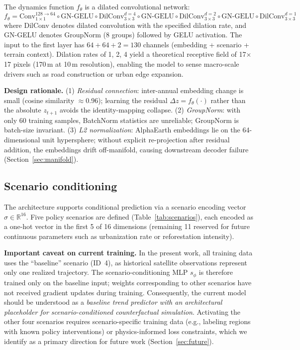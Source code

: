 \documentclass{article}
\begin{document}
The dynamics function $f_\theta$ is a dilated convolutional network:
\begin{equation}
f_\theta = \text{Conv}_{1\times1}^{128 \to 64} \circ \text{GN-GELU} \circ \text{DilConv}_{3\times3}^{d=4} \circ \text{GN-GELU} \circ \text{DilConv}_{3\times3}^{d=2} \circ \text{GN-GELU} \circ \text{DilConv}_{3\times3}^{d=1}
\end{equation}
where DilConv denotes dilated convolution with the specified dilation rate, and GN-GELU denotes GroupNorm (8 groups) followed by GELU activation. The input to the first layer has $64 + 64 + 2 = 130$ channels (embedding + scenario + terrain context). Dilation rates of 1, 2, 4 yield a theoretical receptive field of 17$\times$17 pixels (170\,m at 10\,m resolution), enabling the model to sense macro-scale drivers such as road construction or urban edge expansion.

\textbf{Design rationale.} (1) \textit{Residual connection}: inter-annual embedding change is small (cosine similarity $\approx$0.96); learning the residual $\Delta z = f_\theta(\cdot)$ rather than the absolute $z_{t+1}$ avoids the identity-mapping collapse. (2) \textit{GroupNorm}: with only 60 training samples, BatchNorm statistics are unreliable; GroupNorm is batch-size invariant. (3) \textit{L2 normalization}: AlphaEarth embeddings lie on the 64-dimensional unit hypersphere; without explicit re-projection after residual addition, the embeddings drift off-manifold, causing downstream decoder failure (Section~\ref{sec:manifold}).

\subsection{Scenario conditioning}

The architecture supports conditional prediction via a scenario encoding vector $\sigma \in \mathbb{R}^{16}$. Five policy scenarios are defined (Table~\ref{tab:scenarios}), each encoded as a one-hot vector in the first 5 of 16 dimensions (remaining 11 reserved for future continuous parameters such as urbanization rate or reforestation intensity).

\textbf{Important caveat on current training.} In the present work, all training data uses the ``baseline'' scenario (ID~4), as historical satellite observations represent only one realized trajectory. The scenario-conditioning MLP $s_\phi$ is therefore trained only on the baseline input; weights corresponding to other scenarios have not received gradient updates during training. Consequently, the current model should be understood as a \textit{baseline trend predictor with an architectural placeholder for scenario-conditioned counterfactual simulation}. Activating the other four scenarios requires scenario-specific training data (e.g., labeling regions with known policy interventions) or physics-informed loss constraints, which we identify as a primary direction for future work (Section~\ref{sec:future}).
\end{document}
